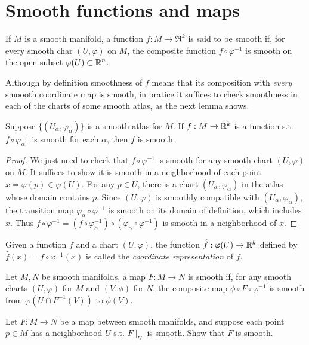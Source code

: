 \section{Smooth functions and maps}
\begin{definition}
If $M$ is a smooth manifold, a function $f:M\rightarrow\Re^k$ is said to be smooth if,
for every smooth char $(U,\varphi)$ on $M$, the composite function $f\circ\varphi^{-1}$
is smooth on the open subset $\varphi(U)\subset \mathbb{R}^n$. 
\end{definition}
Although by definition smoothness of $f$ means that its composition with \emph{every}
smoooth coordinate map is smooth, in pratice it suffices to check smoothness in each
of the charts of some smooth atlas, as the next lemma shows.
\begin{lem}
Suppose $\{(U_\alpha,\varphi_\alpha)\}$ is a smooth atlas for $M$. If $f:M\rightarrow\mathbb{R}^k$
is a function s.t. $f\circ\varphi_{\alpha}^{-1}$ is smooth for each $\alpha$, then $f$ is
smooth.
\end{lem}
\begin{proof}
We just need to check that $f\circ\varphi^{-1}$ is smooth for any smooth chart $(U,\varphi)$
on $M$. It suffices to show it is smooth in a neighborhood of each point $x=\varphi(p)\in 
\varphi(U)$. For any $p\in U$, there is a chart $(U_\alpha,\varphi_\alpha)$ in the atlas whose
domain contains $p$. Since $(U,\varphi)$ is smoothly compatible with $(U_\alpha,\varphi_\alpha)$,
the transition map $\varphi_\alpha\circ\varphi^{-1}$ is smooth on its domain of definition, 
which includes $x$. Thus $f\circ\varphi^{-1}=(f\circ\varphi_{\alpha}^{-1})\circ(\varphi_\alpha
\circ\varphi^{-1})$ is smooth in a neighborhood of $x$.
\end{proof}
Given a function $f$ and a chart $(U,\varphi)$, the function $\hat{f}:\varphi(U)\rightarrow\mathbb{R}^k$
defined by $\hat{f}(x)=f\circ\varphi^{-1}(x)$ is called the \emph{coordinate representation} of $f$.
\begin{definition}
Let $M,N$ be smooth manifolds, a map $F:M\rightarrow N$ is smooth if, for any smooth charts
$(U,\varphi)$ for $M$ and $(V,\phi)$ for $N$, the composite map $\phi\circ F\circ\varphi^{-1}$
is smooth from $\varphi(U\cap F^{-1}(V))$ to $\phi(V)$.
\end{definition}
\begin{exer}
Let $F:M\rightarrow N$ be a map between smooth manifolds, and suppose each point $p\in M$ has a 
neighborhood $U$ s.t. $F\mid_U$ is smooth. Show that $F$ is smooth.
\end{exer}
